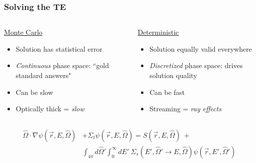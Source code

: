 \documentclass[xcolor=x11names,compress]{beamer}
\renewcommand{\(}{\begin{columns}}
\renewcommand{\)}{\end{columns}}
\newcommand{\<}[1]{\begin{column}{#1}}
\renewcommand{\>}{\end{column}}
\newcommand{\vOmega}{\ensuremath{\hat{\Omega}}}
\begin{document}
\begin{frame}[fragile]
  \frametitle{Solving the TE}
%
\begin{columns}
  \begin{column}{0.5\textwidth}
  \begin{center}
  \underline{Monte Carlo}
  \end{center}
	\begin{itemize}
	\item Solution has statistical error
	\item \textit{Continuous} phase space: ``gold standard answers"
	\item Can be slow
	\item Optically thick = \textit{slow}
	\end{itemize}
  \end{column}
  \begin{column}{0.5\textwidth}
  \begin{center}
  \underline{Deterministic}
  \end{center}
	\begin{itemize}
	\item Solution equally valid everywhere
	\item \textit{Discretized} phase space: drives solution quality
	\item Can be fast
	\item Streaming = \textit{ray effects}
	\end{itemize}
  \end{column}
\end{columns}

\begin{align}
\vOmega \cdot \nabla \psi(\vec{r}, E, \vOmega) &+
\Sigma_t \psi(\vec{r}, E, \vOmega) = S(\vec{r}, E, \vOmega) \:+\nonumber\\
%
& \int_{4\pi} d\vOmega' \int_0^{\infty} dE'\: \Sigma_s(E', \vOmega' \rightarrow E, \vOmega) \psi(\vec{r}, E', \vOmega') \nonumber
\end{align}

\end{frame}
\end{document}
